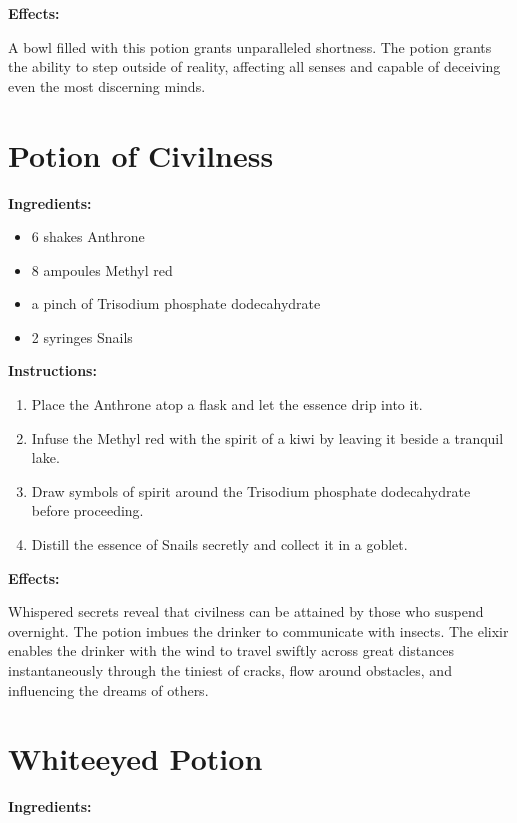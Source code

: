 \documentclass{article}
\begin{document}
\textbf{Effects:}

A bowl filled with this potion grants unparalleled shortness. The potion grants the ability to step outside of reality, affecting all senses and capable of deceiving even the most discerning minds.

\newpage
\section*{Potion of Civilness}

\textbf{Ingredients:}

\begin{itemize}
  \item 6 shakes Anthrone
  \item 8 ampoules Methyl red
  \item a pinch of Trisodium phosphate dodecahydrate
  \item 2 syringes Snails
\end{itemize}

\textbf{Instructions:}

\begin{enumerate}
  \item Place the Anthrone atop a flask and let the essence drip into it.
  \item Infuse the Methyl red with the spirit of a kiwi by leaving it beside a tranquil lake.
  \item Draw symbols of spirit around the Trisodium phosphate dodecahydrate before proceeding.
  \item Distill the essence of Snails secretly and collect it in a goblet.
\end{enumerate}

\textbf{Effects:}

Whispered secrets reveal that civilness can be attained by those who suspend overnight. The potion imbues the drinker to communicate with insects. The elixir enables the drinker with the wind to travel swiftly across great distances instantaneously through the tiniest of cracks, flow around obstacles, and influencing the dreams of others.

\newpage
\section*{Whiteeyed Potion}

\textbf{Ingredients:}
\end{document}
